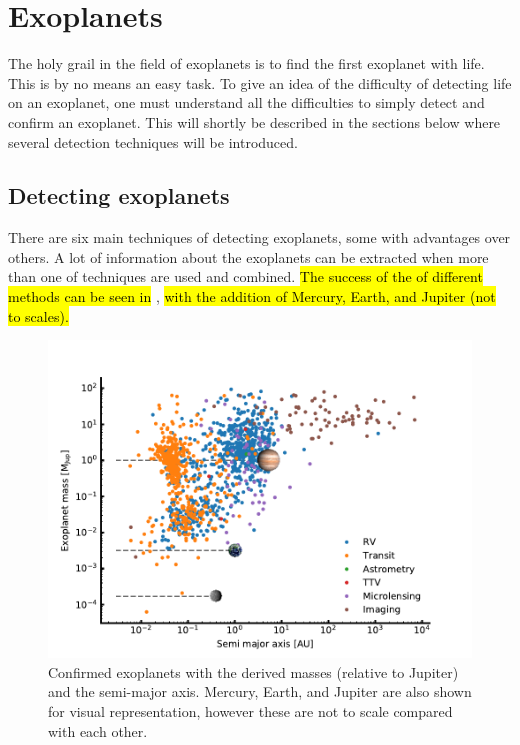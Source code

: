 \section{Exoplanets}
\label{sec:exoplanets}

The holy grail in the field of exoplanets is to find the first exoplanet with life. This is by no
means an easy task. To give an idea of the difficulty of detecting life on an exoplanet, one must
understand all the difficulties to simply detect and confirm an exoplanet. This will shortly be
described in the sections below where several detection techniques will be introduced.

\subsection{Detecting exoplanets}
\label{sec:detecting_exoplanets}

There are six main techniques of detecting exoplanets, some with advantages over others. A lot of
information about the exoplanets can be extracted when more than one of techniques are used and
combined. \hl{The success of the of different methods can be seen in} ,
\hl{with the addition of Mercury, Earth, and Jupiter (not to scales).}

\begin{figure}[htpb!]
    \centering
    \includegraphics[width=1.0\linewidth]{figures/exoplanetDetectionType.pdf}
    \caption{Confirmed exoplanets with the derived masses (relative to Jupiter) and the semi-major
             axis. Mercury, Earth, and Jupiter are also shown for visual representation, however
             these are not to scale compared with each other.}
    \label{fig:detectionTypes}
\end{figure}

